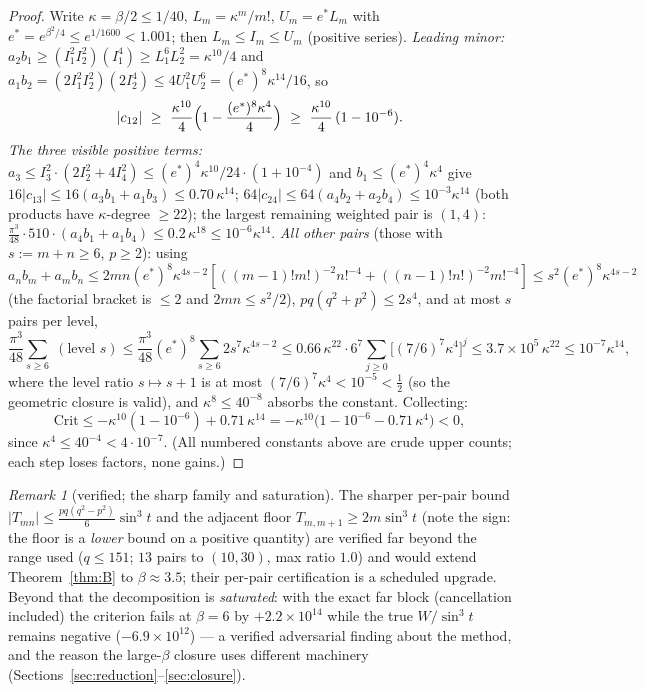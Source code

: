 \documentclass[11pt]{article}
\theoremstyle{remark}
\newtheorem{remark}[theorem]{Remark}
\begin{document}
\begin{proof}
Write $\kappa=\beta/2\le1/40$, $L_m=\kappa^m/m!$,
$U_m=e^*L_m$ with $e^*=e^{\beta^2/4}\le e^{1/1600}<1.001$; then
$L_m\le I_m\le U_m$ (positive series). \emph{Leading minor:}
$a_2b_1\ge(I_1^2I_2^2)(I_1^4)\ge L_1^6L_2^2=\kappa^{10}/4$ and
$a_1b_2=(2I_1^2I_2^2)(2I_2^4)\le4U_1^2U_2^6=(e^*)^8\kappa^{14}/16$,
so
\[
|c_{12}|\ \ge\ \frac{\kappa^{10}}{4}
\Bigl(1-\frac{(e^*)^8\kappa^4}{4}\Bigr)
\ \ge\ \frac{\kappa^{10}}{4}\,(1-10^{-6}).
\]
\emph{The three visible positive terms:}
$a_3\le I_3^2\cdot(2I_2^2+4I_4^2)\le(e^*)^4\kappa^{10}/24\cdot(1+10^{-4})$
and $b_1\le(e^*)^4\kappa^4$ give
$16|c_{13}|\le16(a_3b_1+a_1b_3)\le0.70\,\kappa^{14}$;
$64|c_{24}|\le64(a_4b_2+a_2b_4)\le10^{-3}\kappa^{14}$ (both products
have $\kappa$-degree $\ge22$); the largest remaining weighted pair is
$(1,4)$: $\frac{\pi^3}{48}\cdot510\cdot(a_4b_1+a_1b_4)
\le0.2\,\kappa^{18}\le10^{-6}\kappa^{14}$.
\emph{All other pairs} (those with $s:=m+n\ge6$, $p\ge2$): using
$a_nb_m+a_mb_n\le2mn(e^*)^8\kappa^{4s-2}
[((m-1)!m!)^{-2}n!^{-4}+((n-1)!n!)^{-2}m!^{-4}]
\le s^2(e^*)^8\kappa^{4s-2}$ (the factorial bracket is $\le2$ and
$2mn\le s^2/2$), $pq(q^2+p^2)\le 2s^4$, and at most $s$ pairs per level,
\[
\frac{\pi^3}{48}\!\!\sum_{s\ge6}\!\!\;(\text{level }s)
\le\frac{\pi^3}{48}(e^*)^8\sum_{s\ge6}2s^7\kappa^{4s-2}
\le0.66\,\kappa^{22}\cdot6^7\sum_{j\ge0}\bigl[(7/6)^7\kappa^4\bigr]^j
\le3.7\times10^5\,\kappa^{22}\le10^{-7}\kappa^{14},
\]
where the level ratio $s\mapsto s+1$ is at most
$(7/6)^7\kappa^4<10^{-5}<\tfrac12$ (so the geometric closure is valid),
and $\kappa^{8}\le40^{-8}$ absorbs the constant. Collecting:
\[
\mathrm{Crit}\le-\kappa^{10}(1-10^{-6})+0.71\,\kappa^{14}
=-\kappa^{10}\bigl(1-10^{-6}-0.71\,\kappa^4\bigr)<0,
\]
since $\kappa^4\le40^{-4}<4\cdot10^{-7}$. (All numbered constants above
are crude upper counts; each step loses factors, none gains.)
\end{proof}

\begin{remark}[verified; the sharp family and saturation]
\label{rem:saturation}
The sharper per-pair bound $|T_{mn}|\le\frac{pq(q^2-p^2)}{6}\sin^3t$ and
the adjacent floor $T_{m,m+1}\ge2m\sin^3t$ \textup{(}note the sign: the
floor is a \emph{lower} bound on a positive quantity\textup{)} are
verified far beyond the range used ($q\le151$; $13$ pairs to $(10,30)$,
max ratio $1.0$) and would extend Theorem~\ref{thm:B} to
$\beta\approx3.5$; their per-pair certification is a scheduled upgrade.
Beyond that the decomposition is \emph{saturated}: with the exact far
block (cancellation included) the criterion fails at $\beta=6$ by
$+2.2\times10^{14}$ while the true $W/\sin^3t$ remains negative
($-6.9\times10^{12}$) --- a verified adversarial finding about the
method, and the reason the large-$\beta$ closure uses different
machinery (Sections~\ref{sec:reduction}--\ref{sec:closure}).
\end{remark}
\end{document}
